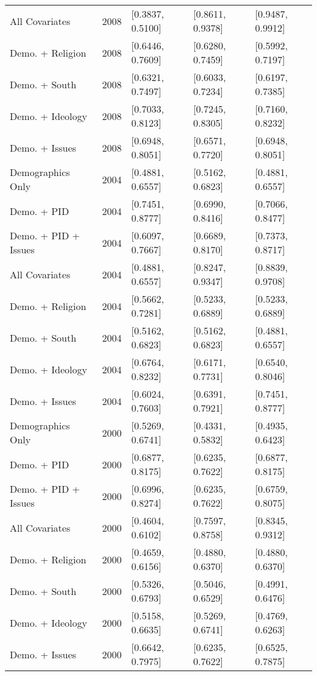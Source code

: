 \begin{longtable}{lrlll}
  All Covariates & 2008 & [0.3837, 0.5100] & [0.8611, 0.9378] & [0.9487, 0.9912] \\ 
  Demo. + Religion & 2008 & [0.6446, 0.7609] & [0.6280, 0.7459] & [0.5992, 0.7197] \\ 
  Demo. + South & 2008 & [0.6321, 0.7497] & [0.6033, 0.7234] & [0.6197, 0.7385] \\ 
  Demo. + Ideology & 2008 & [0.7033, 0.8123] & [0.7245, 0.8305] & [0.7160, 0.8232] \\ 
  Demo. + Issues & 2008 & [0.6948, 0.8051] & [0.6571, 0.7720] & [0.6948, 0.8051] \\ 
  Demographics Only & 2004 & [0.4881, 0.6557] & [0.5162, 0.6823] & [0.4881, 0.6557] \\ 
  Demo. + PID & 2004 & [0.7451, 0.8777] & [0.6990, 0.8416] & [0.7066, 0.8477] \\ 
  Demo. + PID + Issues & 2004 & [0.6097, 0.7667] & [0.6689, 0.8170] & [0.7373, 0.8717] \\ 
  All Covariates & 2004 & [0.4881, 0.6557] & [0.8247, 0.9347] & [0.8839, 0.9708] \\ 
  Demo. + Religion & 2004 & [0.5662, 0.7281] & [0.5233, 0.6889] & [0.5233, 0.6889] \\ 
  Demo. + South & 2004 & [0.5162, 0.6823] & [0.5162, 0.6823] & [0.4881, 0.6557] \\ 
  Demo. + Ideology & 2004 & [0.6764, 0.8232] & [0.6171, 0.7731] & [0.6540, 0.8046] \\ 
  Demo. + Issues & 2004 & [0.6024, 0.7603] & [0.6391, 0.7921] & [0.7451, 0.8777] \\ 
  Demographics Only & 2000 & [0.5269, 0.6741] & [0.4331, 0.5832] & [0.4935, 0.6423] \\ 
  Demo. + PID & 2000 & [0.6877, 0.8175] & [0.6235, 0.7622] & [0.6877, 0.8175] \\ 
  Demo. + PID + Issues & 2000 & [0.6996, 0.8274] & [0.6235, 0.7622] & [0.6759, 0.8075] \\ 
  All Covariates & 2000 & [0.4604, 0.6102] & [0.7597, 0.8758] & [0.8345, 0.9312] \\ 
  Demo. + Religion & 2000 & [0.4659, 0.6156] & [0.4880, 0.6370] & [0.4880, 0.6370] \\ 
  Demo. + South & 2000 & [0.5326, 0.6793] & [0.5046, 0.6529] & [0.4991, 0.6476] \\ 
  Demo. + Ideology & 2000 & [0.5158, 0.6635] & [0.5269, 0.6741] & [0.4769, 0.6263] \\ 
  Demo. + Issues & 2000 & [0.6642, 0.7975] & [0.6235, 0.7622] & [0.6525, 0.7875] \\ 

\end{longtable}

